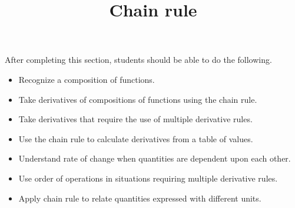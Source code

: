 \documentclass{ximera}
\title{Chain rule}
\begin{document}
\begin{abstract}
\end{abstract}

\maketitle

\begin{sectionOutcomes}

After completing this section, students should be able to do the following.

\begin{itemize}
	\item Recognize a composition of functions.
	\item Take derivatives of compositions of functions using the chain rule.
	\item Take derivatives that require the use of multiple derivative rules.
	\item Use the chain rule to calculate derivatives from a table of values.
	\item Understand rate of change when quantities are dependent upon each other.
	\item Use order of operations in situations requiring multiple derivative rules.
        \item Apply chain rule to relate quantities expressed with different units.
\end{itemize}

\end{sectionOutcomes}
\end{document}
